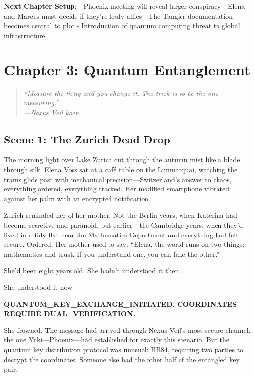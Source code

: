 \documentclass[12pt,letterpaper]{book}
\begin{document}
\textbf{Next Chapter Setup}: - Phoenix meeting will reveal larger conspiracy - Elena and Marcus must decide if they're truly allies - The Tangier documentation becomes central to plot - Introduction of quantum computing threat to global infrastructure


\hypertarget{chapter-3-quantum-entanglement}{%
\section{Chapter 3: Quantum Entanglement}\label{chapter-3-quantum-entanglement}}

\begin{quote}
\itshape ``Measure the thing and you change it. The trick is to be the one
measuring.''\\
\normalfont\hfill---Nexus Veil koan
\end{quote}

\hypertarget{scene-1-the-zurich-dead-drop}{%
\subsection{Scene 1: The Zurich Dead Drop}\label{scene-1-the-zurich-dead-drop}}

The morning light over Lake Zurich cut through the autumn mist like a blade through silk. Elena Voss sat at a café table on the Limmatquai, watching the trams glide past with mechanical precision---Switzerland's answer to chaos, everything ordered, everything tracked. Her modified smartphone vibrated against her palm with an encrypted notification.

Zurich reminded her of her mother. Not the Berlin years, when Katerina had become secretive and paranoid, but earlier---the Cambridge years, when they'd lived in a tidy flat near the Mathematics Department and everything had felt secure. Ordered. Her mother used to say: ``Elena, the world runs on two things: mathematics and trust. If you understand one, you can fake the other.''

She'd been eight years old. She hadn't understood it then.

She understood it now.

\textbf{QUANTUM\_KEY\_EXCHANGE\_INITIATED. COORDINATES REQUIRE DUAL\_VERIFICATION.}

She frowned. The message had arrived through Nexus Veil's most secure channel, the one Yuki---Phoenix---had established for exactly this scenario. But the quantum key distribution protocol was unusual: BB84, requiring two parties to decrypt the coordinates. Someone else had the other half of the entangled key pair.
\end{document}
